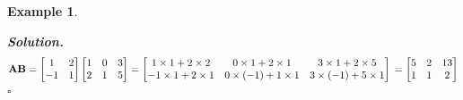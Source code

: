 \documentclass[12pt, a4paper]{article}
\newtheorem{eg}{Example}[subsection]
\newenvironment*{sol}{\par\indent\textbf{\textit{Solution. }}}{\hfill{$\square$}\par}
\def\matrixA{\vb{A}}
\def\matrixB{\vb{B}}
\begin{document}
\begin{eg}
\begin{enumerate}
	\begin{sol}\[	\matrixA\matrixB=\begin{bmatrix}1&2\\-1&1\end{bmatrix}\begin{bmatrix}1&0&3\\2&1&5\end{bmatrix}=\begin{bmatrix}1\times1+2\times2&0\times1+2\times1&3\times1+2\times5\\-1\times1+2\times1&0\times(-1)+1\times1&3\times(-1)+5\times1\end{bmatrix}\\=\begin{bmatrix}5&2&13\\1&1&2\end{bmatrix}\]\end{sol}
\end{enumerate}	
\end{eg}
\end{document}
